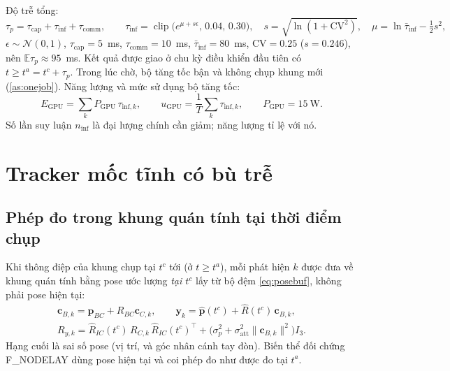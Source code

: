\documentclass[11pt,a4paper]{article}
\numberwithin{equation}{section}
\newcommand{\vb}[1]{\bm{#1}}
\newcommand{\T}{^{\!\top}}
\newcommand{\clip}{\operatorname{clip}}
\theoremstyle{definition}
\theoremstyle{plain}
\theoremstyle{remark}
\begin{document}
Độ trễ tổng:
\begin{equation}
\tau_p=\tau_{\text{cap}}+\tau_{\text{inf}}+\tau_{\text{comm}},\qquad
\tau_{\text{inf}}=\clip\big(e^{\mu+s\epsilon},\,0.04,\,0.30\big),\quad s=\sqrt{\ln(1+\mathrm{CV}^2)},\quad \mu=\ln\bar\tau_{\text{inf}}-\tfrac12s^2, \label{eq:lat}
\end{equation}
$\epsilon\sim\mathcal N(0,1)$, $\tau_{\text{cap}}=5$~ms, $\tau_{\text{comm}}=10$~ms, $\bar\tau_{\text{inf}}=80$~ms, $\mathrm{CV}=0.25$ ($s=0.246$), nên $\mathbb E\tau_p\approx95$~ms. Kết quả được giao ở chu kỳ điều khiển đầu tiên có $t\ge t^a=t^c+\tau_p$. Trong lúc chờ, bộ tăng tốc bận và không chụp khung mới (\ref{as:onejob}). Năng lượng và mức sử dụng bộ tăng tốc:
\begin{equation}
E_{\text{GPU}}=\sum_kP_{\text{GPU}}\,\tau_{\text{inf},k},\qquad u_{\text{GPU}}=\frac1T\sum_k\tau_{\text{inf},k},\qquad P_{\text{GPU}}=15~\text{W}. \label{eq:energy}
\end{equation}
Số lần suy luận $n_{\text{inf}}$ là đại lượng chính cần giảm; năng lượng tỉ lệ với nó.

\section{Tracker mốc tĩnh có bù trễ}
\label{sec:est}

\subsection{Phép đo trong khung quán tính tại thời điểm chụp}
Khi thông điệp của khung chụp tại $t^c$ tới (ở $t\ge t^a$), mỗi phát hiện $k$ được đưa về khung quán tính bằng pose ước lượng \emph{tại $t^c$} lấy từ bộ đệm \eqref{eq:posebuf}, không phải pose hiện tại:
\begin{gather}
\vb c_{B,k}=\vb p_{BC}+R_{BC}\vb c_{C,k},\qquad
\vb y_k=\hat{\vb p}(t^c)+\hat R(t^c)\,\vb c_{B,k}, \label{eq:toI}\\
R_{y,k}=\hat R_{IC}(t^c)\,R_{C,k}\,\hat R_{IC}(t^c)\T+\big(\sigma_p^2+\sigma_{\text{att}}^2\|\vb c_{B,k}\|^2\big)I_3. \label{eq:RI}
\end{gather}
Hạng cuối là sai số pose (vị trí, và góc nhân cánh tay đòn). Biến thể đối chứng F\_NODELAY dùng pose hiện tại và coi phép đo như được đo tại $t^a$.
\end{document}

